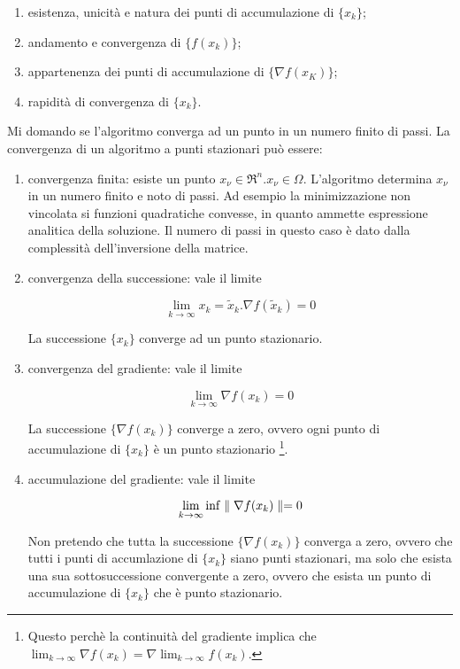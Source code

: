 \begin{enumerate}

	\item esistenza, unicità e natura dei punti di accumulazione di $\{x_{k}\}$;

	\item andamento e convergenza di $\{f(x_{k})\}$;

	\item appartenenza dei punti di accumulazione di $\{\nabla f(x_{K})\}$;

	\item rapidità di convergenza di $\{x_{k}\}$.

\end{enumerate}

Mi domando se l'algoritmo converga ad un punto in un numero finito di passi.
La convergenza di un algoritmo a punti stazionari può essere:

\begin{enumerate}

	\item convergenza finita: esiste un punto $x_{\nu}\in\Re^{n}.x_{\nu}\in\Omega$. L'algoritmo determina $x_{\nu}$ in un numero finito e noto di passi. Ad esempio la minimizzazione non vincolata si funzioni quadratiche convesse, in quanto ammette espressione analitica della soluzione. Il numero di passi in questo caso è dato dalla complessità dell'inversione della matrice.

	\item convergenza della successione: vale il limite

	\begin{equation}
	\lim_{k\rightarrow\infty}x_{k} = \tilde{x}_{k}.\nabla f(\tilde{x}_{k})=0
	\end{equation}

	La successione $\{x_{k}\}$ converge ad un punto stazionario.

	\item convergenza del gradiente: vale il limite

	\begin{equation}
	\lim_{k\rightarrow\infty}\nabla f(x_{k}) = 0
	\end{equation}

	La successione $\{\nabla f(x_{k})\}$ converge a zero, ovvero ogni punto di accumulazione di $\{x_{k}\}$ è un punto stazionario \footnote{Questo perchè la continuità del gradiente implica che $\lim_{k\rightarrow\infty}\nabla f(x_{k}) = \nabla\lim_{k\rightarrow\infty}f(x_{k})$.}.

	\item accumulazione del gradiente: vale il limite

	\begin{equation}
	\lim_{k\rightarrow\infty}\inf\parallel \nabla f(x_{k}) \parallel = 0
	\end{equation}

	Non pretendo che tutta la successione $\{\nabla f(x_{k})\}$ converga a zero, ovvero che tutti i punti di accumlazione di $\{x_{k}\}$ siano punti stazionari, ma solo che esista una sua sottosuccessione convergente a zero, ovvero che esista un punto di accumulazione di $\{x_{k}\}$ che è punto stazionario.
\end{enumerate}

